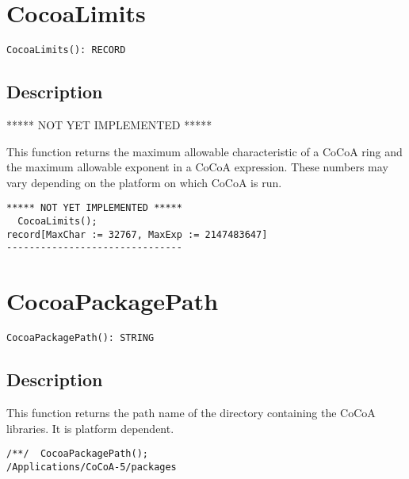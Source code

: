 \documentclass[a4paper]{mybook}
\newenvironment{command}{}{} %
\begin{document}
\section{CocoaLimits}
\label{CocoaLimits}
\begin{command} %


\begin{Verbatim}[label=syntax, rulecolor=\color{MidnightBlue},
frame=single]
CocoaLimits(): RECORD
\end{Verbatim}


\subsection*{Description}

***** NOT YET IMPLEMENTED *****
\par 
This function returns the maximum allowable characteristic of a CoCoA
ring and the maximum allowable exponent in a CoCoA expression.  These
numbers may vary depending on the platform on which CoCoA is run.
\begin{Verbatim}[label=example, rulecolor=\color{PineGreen}, frame=single]
***** NOT YET IMPLEMENTED *****
  CocoaLimits();
record[MaxChar := 32767, MaxExp := 2147483647]
-------------------------------
\end{Verbatim}


\end{command} %

\section{CocoaPackagePath}
\label{CocoaPackagePath}
\begin{command} %


\begin{Verbatim}[label=syntax, rulecolor=\color{MidnightBlue},
frame=single]
CocoaPackagePath(): STRING
\end{Verbatim}


\subsection*{Description}

This function returns the path name of the directory containing the CoCoA
libraries. It is platform dependent.
\begin{Verbatim}[label=example, rulecolor=\color{PineGreen}, frame=single]
/**/  CocoaPackagePath();
/Applications/CoCoA-5/packages
\end{Verbatim}


\end{command} %
\end{document}
